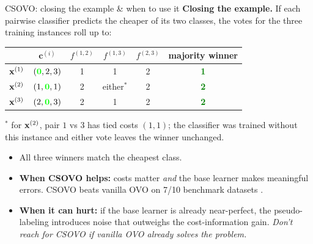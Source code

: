 \documentclass[11pt,compress,t,notes=noshow, xcolor=table]{beamer}
\newcommand{\cv}{\mathbf{c}}
\begin{document}
\begin{frame}{CSOVO: closing the example \& when to use it}
    \small
    \textbf{Closing the example.} If each pairwise classifier predicts the cheaper of its two classes, the votes for the three training instances roll up to:

    \begin{center}
        \footnotesize
        \begin{tabular}{c|c|ccc|c}
             & $\cv^{(i)}$ & $f^{(1,2)}$ & $f^{(1,3)}$ & $f^{(2,3)}$ & majority winner \\
            \hline
            $\mathbf{x}^{(1)}$ & $(\textcolor{green}{\textbf{0}}, 2, 3)$ & 1 & 1 & 2 & \textbf{\textcolor{green}{1}} \\
            $\mathbf{x}^{(2)}$ & $(1, \textcolor{green}{\textbf{0}}, 1)$ & 2 & either$^*$ & 2 & \textbf{\textcolor{green}{2}} \\
            $\mathbf{x}^{(3)}$ & $(2, \textcolor{green}{\textbf{0}}, 3)$ & 2 & 1 & 2 & \textbf{\textcolor{green}{2}} \\
        \end{tabular}
    \end{center}
    {\footnotesize $^*$ for $\mathbf{x}^{(2)}$, pair $1$ vs $3$ has tied costs $(1, 1)$; the classifier was trained without this instance and either vote leaves the winner unchanged.}

    \begin{itemize}
        \item All three winners match the cheapest class.
        \item \textbf{When CSOVO helps:} costs matter \emph{and} the base learner makes meaningful errors. CSOVO beats vanilla OVO on 7/10 benchmark datasets .
        \item \textbf{When it can hurt:} if the base learner is already near-perfect, the pseudo-labeling introduces noise that outweighs the cost-information gain. \emph{Don't reach for CSOVO if vanilla OVO already solves the problem.}
    \end{itemize}
\end{frame}
\end{document}

